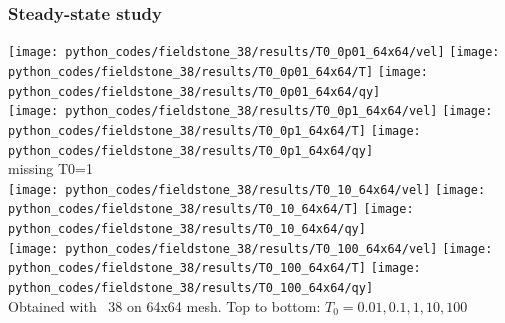 \newpage
\subsubsection*{Steady-state study}

\begin{center}
\texttt{[image: python\_codes/fieldstone\_38/results/T0\_0p01\_64x64/vel]}
\texttt{[image: python\_codes/fieldstone\_38/results/T0\_0p01\_64x64/T]}
\texttt{[image: python\_codes/fieldstone\_38/results/T0\_0p01\_64x64/qy]}\\
\texttt{[image: python\_codes/fieldstone\_38/results/T0\_0p1\_64x64/vel]}
\texttt{[image: python\_codes/fieldstone\_38/results/T0\_0p1\_64x64/T]}
\texttt{[image: python\_codes/fieldstone\_38/results/T0\_0p1\_64x64/qy]}\\
missing T0=1 \\
\texttt{[image: python\_codes/fieldstone\_38/results/T0\_10\_64x64/vel]}
\texttt{[image: python\_codes/fieldstone\_38/results/T0\_10\_64x64/T]}
\texttt{[image: python\_codes/fieldstone\_38/results/T0\_10\_64x64/qy]}\\
\texttt{[image: python\_codes/fieldstone\_38/results/T0\_100\_64x64/vel]}
\texttt{[image: python\_codes/fieldstone\_38/results/T0\_100\_64x64/T]}
\texttt{[image: python\_codes/fieldstone\_38/results/T0\_100\_64x64/qy]}\\
{\captionfont Obtained with \stone~38 on 64x64 mesh. 
Top to bottom: $T_0=0.01,0.1,1,10,100$}
\end{center}

